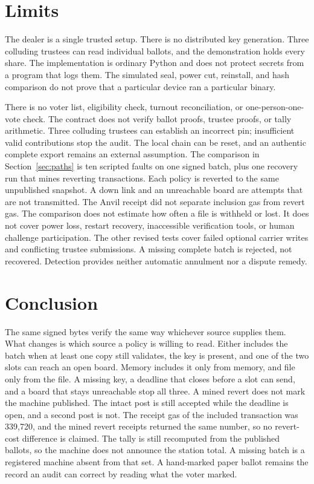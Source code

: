\documentclass[11pt]{article}
\begin{document}
\section{Limits}
\label{sec:limits}
The dealer is a single trusted setup. There is no distributed key generation. Three colluding trustees can read individual ballots, and the demonstration holds every share. The implementation is ordinary Python and does not protect secrets from a program that logs them. The simulated seal, power cut, reinstall, and hash comparison do not prove that a particular device ran a particular binary.

There is no voter list, eligibility check, turnout reconciliation, or one-person-one-vote check. The contract does not verify ballot proofs, trustee proofs, or tally arithmetic. Three colluding trustees can establish an incorrect pin; insufficient valid contributions stop the audit. The local chain can be reset, and an authentic complete export remains an external assumption. The comparison in Section~\ref{sec:paths} is ten scripted faults on one signed batch, plus one recovery run that mines reverting transactions. Each policy is reverted to the same unpublished snapshot. A down link and an unreachable board are attempts that are not transmitted. The Anvil receipt did not separate inclusion gas from revert gas. The comparison does not estimate how often a file is withheld or lost. It does not cover power loss, restart recovery, inaccessible verification tools, or human challenge participation. The other revised tests cover failed optional carrier writes and conflicting trustee submissions. A missing complete batch is rejected, not recovered. Detection provides neither automatic annulment nor a dispute remedy.

\section{Conclusion}
The same signed bytes verify the same way whichever source supplies them. What changes is which source a policy is willing to read. Either includes the batch when at least one copy still validates, the key is present, and one of the two slots can reach an open board. Memory includes it only from memory, and file only from the file. A missing key, a deadline that closes before a slot can send, and a board that stays unreachable stop all three. A mined revert does not mark the machine published. The intact post is still accepted while the deadline is open, and a second post is not. The receipt gas of the included transaction was 339{,}720, and the mined revert receipts returned the same number, so no revert-cost difference is claimed. The tally is still recomputed from the published ballots, so the machine does not announce the station total. A missing batch is a registered machine absent from that set. A hand-marked paper ballot remains the record an audit can correct by reading what the voter marked.
\end{document}
